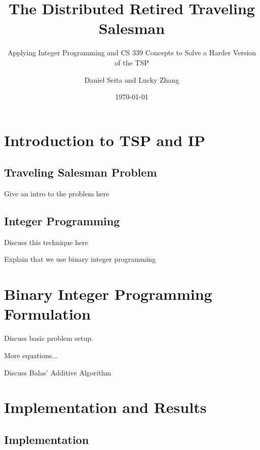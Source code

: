\documentclass[10pt, xcolor=svgnames]{beamer}
\title[Distributed TSP]{The Distributed Retired Traveling Salesman}
\subtitle{Applying Integer Programming and CS 339 Concepts to Solve a Harder Version of the TSP}
\author[Seita and Zhang]{Daniel Seita and Lucky Zhang}
\institute[Williams College]{Department of Computer Science, Williams College}
\date{\today}
\begin{document}
\begin{frame}
	\titlepage
\end{frame}



\section{Introduction to TSP and IP}

\subsection{Traveling Salesman Problem}

\begin{frame}
Give an intro to the problem here
\end{frame}

\subsection{Integer Programming}

\begin{frame}
Discuss this technique here

Explain that we use binary integer programming
\end{frame}


\section{Binary Integer Programming Formulation}

\begin{frame}
Discuss basic problem setup.
\end{frame}

\begin{frame}
More equations...
\end{frame}

\begin{frame}
Discuss Balas' Additive Algorithm
\end{frame}


\section{Implementation and Results}

\subsection{Implementation}
\end{document}
